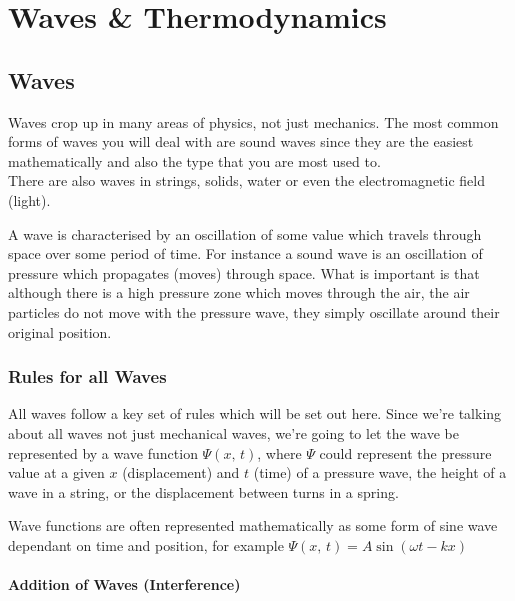 \documentclass[main.tex]{subfiles}
\begin{document}
    \chapter{Waves \& Thermodynamics}
        \label{ch: Waves and Thermodynamics}
        \thispagestyle{noheader}


        \section{Waves}
            \label{sec: Waves}

            Waves crop up in many areas of physics, not just mechanics. The most common forms of waves you will deal with are sound waves since they are the easiest mathematically and also the type that you are most used to.\\
            There are also waves in strings, solids, water or even the electromagnetic field (light). 

            A wave is characterised by an oscillation of some value which travels through space over some period of time. For instance a sound wave is an oscillation of pressure which propagates (moves) through space. What is important is that although there is a high pressure zone which moves through the air, the air particles do not move with the pressure wave, they simply oscillate around their original position.

            \subsection{Rules for all Waves}
                \label{subsec: Rules for all Waves}

                All waves follow a key set of rules which will be set out here. Since we're talking about all waves not just mechanical waves, we're going to let the wave be represented by a wave function $\Psi(x,\,t)$, where $\Psi$ could represent the pressure value at a given $x$ (displacement) and $t$ (time) of a pressure wave, the height of a wave in a string, or the displacement between turns in a spring.

                Wave functions are often represented mathematically as some form of sine wave dependant on time and position, for example $\Psi(x,\,t) = A \sin (\omega t - kx)$

                \subsubsection{Addition of Waves (Interference)}
                    \label{subsubsec: Addition of Waves}
\end{document}
